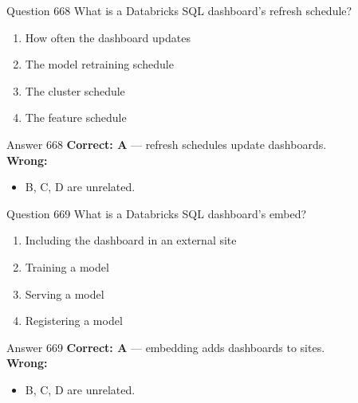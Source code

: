 \documentclass[aspectratio=169,11pt]{beamer}
\begin{document}
	\begin{frame}{Question 668}
		What is a Databricks SQL dashboard's refresh schedule?
		\begin{enumerate}[label=\Alph*.]
			\item How often the dashboard updates
			\item The model retraining schedule
			\item The cluster schedule
			\item The feature schedule
		\end{enumerate}
	\end{frame}
	\begin{frame}{Answer 668}
		\textbf{Correct: A} --- refresh schedules update dashboards.\\
		\vspace{0.5em}
		\textbf{Wrong:}
		\begin{itemize}
			\item B, C, D are unrelated.
		\end{itemize}
	\end{frame}
	
	\begin{frame}{Question 669}
		What is a Databricks SQL dashboard's embed?
		\begin{enumerate}[label=\Alph*.]
			\item Including the dashboard in an external site
			\item Training a model
			\item Serving a model
			\item Registering a model
		\end{enumerate}
	\end{frame}
	\begin{frame}{Answer 669}
		\textbf{Correct: A} --- embedding adds dashboards to sites.\\
		\vspace{0.5em}
		\textbf{Wrong:}
		\begin{itemize}
			\item B, C, D are unrelated.
		\end{itemize}
	\end{frame}
	
\end{document}
